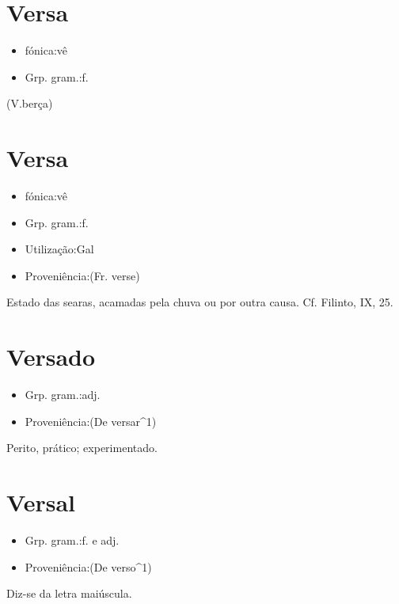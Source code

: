 \documentclass{article}
\begin{document}
\section{Versa}
\begin{itemize}
\item {fónica:vê}
\end{itemize}
\begin{itemize}
\item {Grp. gram.:f.}
\end{itemize}
(V.berça)
\section{Versa}
\begin{itemize}
\item {fónica:vê}
\end{itemize}
\begin{itemize}
\item {Grp. gram.:f.}
\end{itemize}
\begin{itemize}
\item {Utilização:Gal}
\end{itemize}
\begin{itemize}
\item {Proveniência:(Fr. \textunderscore verse\textunderscore )}
\end{itemize}
Estado das searas, acamadas pela chuva ou por outra causa. Cf. Filinto, IX, 25.
\section{Versado}
\begin{itemize}
\item {Grp. gram.:adj.}
\end{itemize}
\begin{itemize}
\item {Proveniência:(De \textunderscore versar\textunderscore ^1)}
\end{itemize}
Perito, prático; experimentado.
\section{Versal}
\begin{itemize}
\item {Grp. gram.:f.  e  adj.}
\end{itemize}
\begin{itemize}
\item {Proveniência:(De \textunderscore verso\textunderscore ^1)}
\end{itemize}
Diz-se da letra maiúscula.
\end{document}
